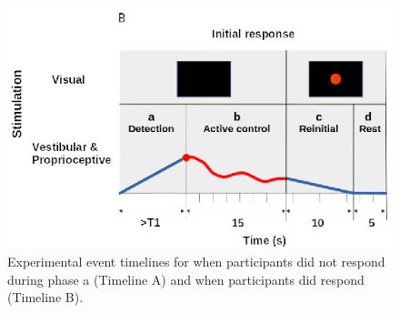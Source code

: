 \begin{figure}[htp]
\begin{center}
\includegraphics[width=1.0\linewidth]{figures/figure2B.eps}
\end{center}
\caption{Experimental event timelines for when participants did not respond during phase a (Timeline A) and when participants did respond (Timeline B).}
\label{fig2}
\end{figure}

